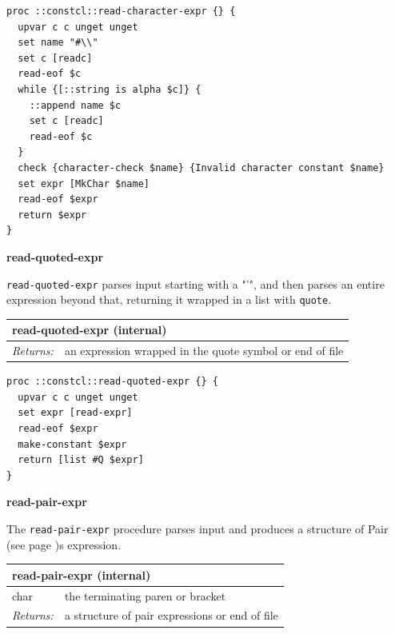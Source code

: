 \documentclass[twoside,9pt]{report}
\begin{document}
\noindent\makebox[\linewidth]{\rule{\linewidth}{0.4pt}}
\begin{lstlisting}
proc ::constcl::read-character-expr {} {
  upvar c c unget unget
  set name "#\\"
  set c [readc]
  read-eof $c
  while {[::string is alpha $c]} {
    ::append name $c
    set c [readc]
    read-eof $c
  }
  check {character-check $name} {Invalid character constant $name}
  set expr [MkChar $name]
  read-eof $expr
  return $expr
}
\end{lstlisting}
\noindent\makebox[\linewidth]{\rule{\linewidth}{0.4pt}}

\textbf{read-quoted-expr}


\texttt{read-quoted-expr} parses input starting with a "'", and then parses an entire expression beyond that, returning it wrapped in a list with \texttt{quote}.

\begin{tabular}{ |l l| }
\hline
\multicolumn{2}{|l|}{read-quoted-expr (internal)} \\
\hline
\textit{Returns:} & an expression wrapped in the quote symbol or end of file \\
\hline
\end{tabular}

\noindent\makebox[\linewidth]{\rule{\linewidth}{0.4pt}}
\begin{lstlisting}
proc ::constcl::read-quoted-expr {} {
  upvar c c unget unget
  set expr [read-expr]
  read-eof $expr
  make-constant $expr
  return [list #Q $expr]
}
\end{lstlisting}
\noindent\makebox[\linewidth]{\rule{\linewidth}{0.4pt}}

\textbf{read-pair-expr}


The \texttt{read-pair-expr} procedure parses input and produces a structure of Pair (see page \pageref{pairs-and-lists})s expression.

\begin{tabular}{ |l l| }
\hline
\multicolumn{2}{|l|}{read-pair-expr (internal)} \\
\hline
char & the terminating paren or bracket \\
\textit{Returns:} & a structure of pair expressions or end of file \\
\hline
\end{tabular}
\end{document}
